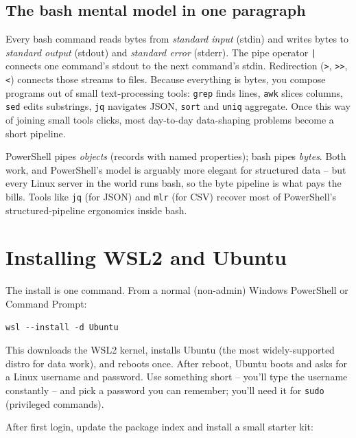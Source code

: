 \documentclass[11pt,a4paper]{article}
\begin{document}
\subsection*{The bash mental model in one paragraph}

Every bash command reads bytes from \emph{standard input} (stdin) and
writes bytes to \emph{standard output} (stdout) and \emph{standard
error} (stderr). The pipe operator \texttt{|} connects one command's
stdout to the next command's stdin. Redirection (\texttt{>},
\texttt{>>}, \texttt{<}) connects those streams to files. Because
everything is bytes, you compose programs out of small text-processing
tools: \texttt{grep} finds lines, \texttt{awk} slices columns,
\texttt{sed} edits substrings, \texttt{jq} navigates JSON,
\texttt{sort} and \texttt{uniq} aggregate. Once this way of joining
small tools clicks, most day-to-day data-shaping problems become a
short pipeline.

\begin{compareps}
PowerShell pipes \emph{objects} (records with named properties); bash
pipes \emph{bytes}. Both work, and PowerShell's model is arguably
more elegant for structured data -- but every Linux server in the
world runs bash, so the byte pipeline is what pays the bills.
Tools like \texttt{jq} (for JSON) and \texttt{mlr} (for CSV)
recover most of PowerShell's structured-pipeline ergonomics inside
bash.
\end{compareps}

\section{Installing WSL2 and Ubuntu}

The install is one command. From a normal (non-admin) Windows
PowerShell or Command Prompt:

\begin{lstlisting}[style=pwshstyle]
wsl --install -d Ubuntu
\end{lstlisting}

This downloads the WSL2 kernel, installs Ubuntu (the most
widely-supported distro for data work), and reboots once. After
reboot, Ubuntu boots and asks for a Linux username and password. Use
something short -- you'll type the username constantly -- and pick a
password you can remember; you'll need it for \texttt{sudo} (privileged
commands).

After first login, update the package index and install a small
starter kit:
\end{document}
